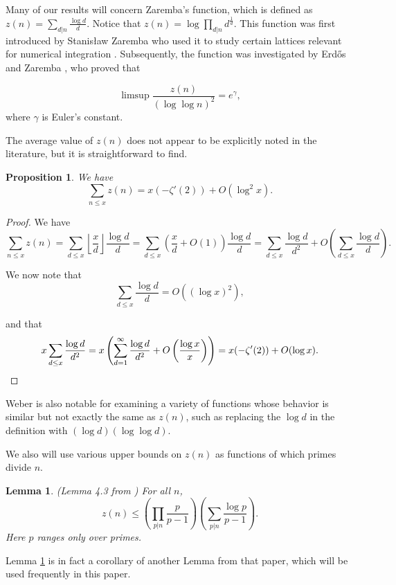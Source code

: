 \documentclass{article}
\newtheorem{lemma}[theorem]{Lemma}
\newtheorem{proposition}[theorem]{Proposition}
\begin{document}
Many of our results will concern  Zaremba's function, which is defined as $z(n) = \sum_{d|n}\frac{\log d}{d}$. Notice that $z(n)= \log \prod_{d|n}d^{\frac{1}{d}}$.  This function was first introduced by Stanis\l{}aw Zaremba who used it to study certain lattices relevant for numerical integration \cite{Zaremba}. Subsequently, the function was investigated by Erd\H{o}s and Zaremba \cite{EZ}, who proved that

$$\limsup \frac{z(n)}{(\log \log n)^2} = e^\gamma,$$ where $\gamma$ is Euler's constant.

The average value of $z(n)$ does not appear to be explicitly noted in the literature, but it is straightforward to find. 
\begin{proposition} We  have
$$\sum_{n \leq x}z(n) = x(-\zeta'(2)) + O(\log^2 x).$$
\end{proposition}
\begin{proof} We have \begin{equation}\sum_{n \leq x} z(n) = \sum_{d \leq x}\left\lfloor \frac{x}{d}\right\rfloor \frac{\log d}{d} = \sum_{d \leq x}\left( \frac{x}{d} +O(1)\right) \frac{\log d}{d} = \sum_{d \leq x}\frac{\log d}{d^2} +O\left(\sum_{d \leq x} \frac{\log d}{d} \right). \end{equation}

We now note that $$\sum_{d \leq x} \frac{\log d}{d}= O ((\log x)^2), $$

and that $$x\sum_{d \leq x}\frac{\log d}{d^2} = x\left(\sum_{d=1}^{\infty} \frac{\log d}{d^2}+O\left(\frac{\log x}{x}\right)\right) = x(-\zeta'(2)) + O(\log x).\qedhere$$ 
\end{proof}

Weber \cite{Weber} is also notable for examining a variety of functions whose behavior is similar but not exactly the same as $z(n)$, such as replacing the $\log d$ in the definition with $(\log d)(\log \log d)$. 

We also will use various upper bounds on $z(n)$ as functions of which primes divide $n$. 

\begin{lemma}\label{Lemma 4.3 from Weber}(Lemma 4.3 from \cite{Weber}) For all $n$, $$z(n) \leq\left( \prod_{p|n} \frac{p}{p-1} \right)\left(\sum_{p|n} \frac{\log p}{p-1}\right). $$ Here $p$ ranges only over primes.
\end{lemma}

Lemma \ref{Lemma 4.3 from Weber} is in fact a corollary of another Lemma from that paper, which will be used frequently in this paper. 
\end{document}
